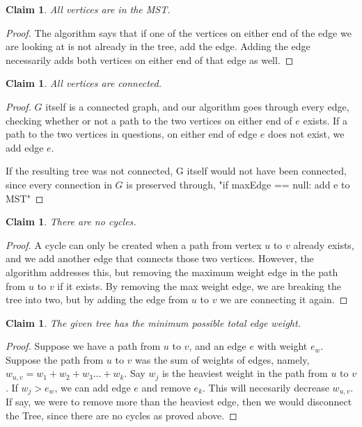 \documentclass[11pt]{article}
\newtheorem{claim}[theorem]{Claim}
\begin{document}
	\begin{claim} 
		All vertices are in the MST.
	\end{claim}
	
	\begin{proof}
		The algorithm says that if one of the vertices on either end of the edge we are looking at is not already in the tree, add the edge. Adding the edge necessarily adds both vertices on either end of that edge as well. 
	\end{proof}

	\begin{claim} 
		All vertices are connected.
	\end{claim}
	
	\begin{proof}
		$G$ itself is a connected graph, and our algorithm goes through every edge, checking whether or not a path to the two vertices on either end of $e$ exists. If a path to the two vertices in questions, on either end of edge $e$ does not exist, we add edge $e$. 
		
		If the resulting tree was not connected, G itself would not have been connected, since every connection in $G$ is preserved through, "if maxEdge == null: add e to MST"
	\end{proof}

	\begin{claim} 
		There are no cycles.
	\end{claim}
	
	\begin{proof}
		A cycle can only be created when a path from vertex $u$ to $v$ already exists, and we add another edge that connects those two vertices. However, the algorithm addresses this, but removing the maximum weight edge in the path from $u$ to $v$ if it exists. By removing the max weight edge, we are breaking the tree into two, but by adding the edge from $u$ to $v$ we are connecting it again. 
	\end{proof}

	\begin{claim} 
		The given tree has the minimum possible total edge weight.
	\end{claim}
	
	\begin{proof}
		Suppose we have a path from $u$ to $v$, and an edge $e$ with weight $e_w$. Suppose the path from $u$ to $v$ was the sum of weights of edges, namely, $w_{u,v} = w_1 + w_2 + w_3 ... + w_k$. Say $w_j$ is the heaviest weight in the path from $u$ to $v$. If $w_j > e_w$, we can add edge $e$ and remove $e_k$. This will necesarily decrease $w_{u,v}$. If say, we were to remove more than the heaviest edge, then we would disconnect the Tree, since there are no cycles as proved above.
	\end{proof}
\end{document}
